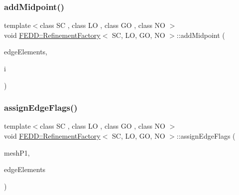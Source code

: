 \subsubsection{\texorpdfstring{add\+Midpoint()}{addMidpoint()}}
{\footnotesize\ttfamily template$<$class SC , class LO , class GO , class NO $>$ \\
void \hyperlink{classFEDD_1_1RefinementFactory}{F\+E\+D\+D\+::\+Refinement\+Factory}$<$ SC, LO, GO, NO $>$\+::add\+Midpoint (\begin{DoxyParamCaption}\item[{\hyperlink{classFEDD_1_1RefinementFactory_ae5285e990ec4632d6188a1280627ad13}{Edge\+Elements\+Ptr\+\_\+\+Type}}]{edge\+Elements,  }\item[{int}]{i }\end{DoxyParamCaption})}

\mbox{\label{classFEDD_1_1RefinementFactory_af0154ebdd6c904d62715d11fcd063259}} 
\subsubsection{\texorpdfstring{assign\+Edge\+Flags()}{assignEdgeFlags()}}
{\footnotesize\ttfamily template$<$class SC , class LO , class GO , class NO $>$ \\
void \hyperlink{classFEDD_1_1RefinementFactory}{F\+E\+D\+D\+::\+Refinement\+Factory}$<$ SC, LO, GO, NO $>$\+::assign\+Edge\+Flags (\begin{DoxyParamCaption}\item[{\hyperlink{classFEDD_1_1RefinementFactory_a1a278d01c278972af01f2996247af8ac}{Mesh\+Unstr\+Ptr\+\_\+\+Type}}]{mesh\+P1,  }\item[{\hyperlink{classFEDD_1_1RefinementFactory_ae5285e990ec4632d6188a1280627ad13}{Edge\+Elements\+Ptr\+\_\+\+Type}}]{edge\+Elements }\end{DoxyParamCaption})}

\mbox{\label{classFEDD_1_1RefinementFactory_a4294d0901e6691203b9043bb2f9c6ac6}} 
